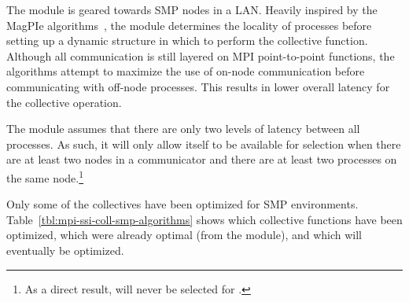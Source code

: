 The  module is geared towards SMP nodes in a LAN.  Heavily
inspired by the MagPIe
algorithms~\cite{kielmann++:00:magpie_bandwidth}, the 
module determines the locality of processes before setting up a
dynamic structure in which to perform the collective function.
Although all communication is still layered on MPI point-to-point
functions, the algorithms attempt to maximize the use of on-node
communication before communicating with off-node processes.  This
results in lower overall latency for the collective operation.  

The  module assumes that there are only two levels of
latency between all processes.  As such, it will only allow itself to
be available for selection when there are at least two nodes in a
communicator and there are at least two processes on the same
node.\footnote{As a direct result,  will never be selected
  for \mcs.}

Only some of the collectives have been optimized for SMP environments.
Table~\ref{tbl:mpi-ssi-coll-smp-algorithms} shows which collective
functions have been optimized, which were already optimal (from the
 module), and which will eventually be optimized.

\def\lbid{Identical to \coll{lam\_\-basic} algorithm; already
  optimized for SMP environments.}
\def\smpopt{Optimized for SMP environments.}
\def\smpnoopt{Not yet optimized for SMP environments; uses
  \coll{lam\_\-basic} algorithm instead.}

